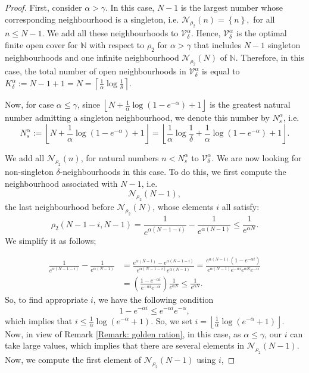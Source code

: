\documentclass[10pt,a4paper]{amsart}
\def\N{\ensuremath{\mathbb N}}
\begin{document}
\begin{proof}
 First, consider $\alpha>\gamma$. In this case, $N-1$ is the largest number whose corresponding neighbourhood is a singleton, i.e. $\mathcal{N}_{\rho_2}(n)=\left\{n\right\},$ for all $n\le N-1$. We add all these neighbourhoods to $\mathcal{V}_\delta^{\alpha}$. Hence, $\mathcal{V}_\delta^{\alpha}$ is the optimal finite open cover for $\N$ with respect to ${\rho_2}$ for ${\alpha>\gamma}$ that includes $N-1$ singleton neighbourhoods and one infinite neighbourhood $\mathcal{N}_{\rho_2}(N)$ of $\N$. Therefore, in this case, the total number of open neighbourhoods in $\mathcal{V}_\delta^{\alpha}$ is equal to $K_\delta^{\alpha}:=N-1+1=N=\left\lceil \frac{1}{\alpha}\log\frac{1}{\delta}\right\rceil$.


 Now, for case $\alpha\le \gamma$, since $\left\lfloor N+\frac{1}{\alpha}\log(1-e^{-\alpha}) +1 \right\rfloor$ is the greatest natural number admitting a singleton neighbourhood, we denote this number by $N_s^{\alpha}$, i.e. $$N_s^{\alpha}:=\left\lfloor N+\frac{1}{\alpha}\log(1-e^{-\alpha}) +1 \right\rfloor= \left\lfloor \frac{1}{\alpha}\log\frac{1}{\delta}+\frac{1}{\alpha}\log(1-e^{-\alpha})+1  \right\rfloor.$$

We add all $\mathcal{N}_{\rho_2}(n)$, for natural numbers $n<N_s^{\alpha}$ to $\mathcal{V}_\delta^{\alpha}$. We are now looking for non-singleton $\delta$-neighbourhoods in this case. To do this, we first compute the neighbourhood associated with $N-1$, i.e. $$\mathcal{N}_{\rho_2}(N-1),$$ the last neighbourhood before $\mathcal{N}_{\rho_2}(N)$, whose elements $i$ all satisfy: 
$${\rho_2}(N-1-i,N-1)=\frac{1}{e^{\alpha(N-1-i)}}-\frac{1}{e^{\alpha(N-1)}}\le \frac{1}{e^{\alpha N}}.$$
We simplify it as follows;

\begin{align*}
\frac{1}{e^{\alpha(N-1-i)}}-\frac{1}{e^{\alpha(N-1)}}&= \frac{e^{\alpha(N-1)}-e^{\alpha(N-1-i)}}{e^{\alpha(N-1-i)}e^{\alpha(N-1)}}=\frac{e^{\alpha(N-1)}(1-e^{-\alpha i})}{e^{\alpha(N-1)}e^{-\alpha i}e^{\alpha N}e^{-\alpha }}\\&= \left(\frac{1-e^{-\alpha i}}{e^{-\alpha i}e^{-\alpha }}\right)\frac{1}{e^{\alpha N}} \le \frac{1}{e^{\alpha N}}.\end{align*}
So, to find appropriate $i$, we have the following condition
$$ 1-e^{-\alpha i}\le e^{-\alpha i}e^{-\alpha },$$
which implies that $i\le\frac{1}{\alpha}\log\left(e^{-\alpha}+1\right)$. So, we set $i=\left\lfloor\frac{1}{\alpha}\log\left(e^{-\alpha}+1\right)\right\rfloor$. Now, in view of Remark \ref{Remark: golden ration}, in this case, as $\alpha\le\gamma$, our $i$ can take large values, which implies that there are several elements in $\mathcal{N}_{\rho_2}(N-1)$. Now, we compute the first element of $\mathcal{N}_{\rho_2}(N-1)$ using $i$,


\end{proof}
\end{document}
